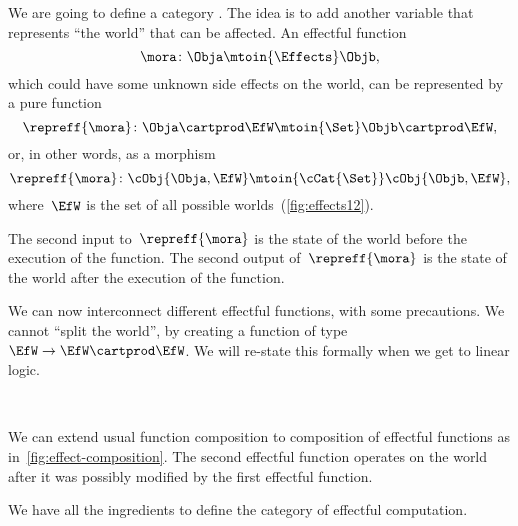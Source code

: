 We are going to define a category \Effects.
The idea is to add another variable that represents ``the world'' that can be affected.
An effectful function
%
\begin{equation}
    \mora\colon \Obja \mtoin{\Effects} \Objb,
\end{equation}
%
which could have some unknown side effects on the world, can be represented by a pure function
\begin{equation}
    \repreff{\mora}\colon  \Obja  \cartprod \EfW \mtoin{\Set}   \Objb \cartprod \EfW,
\end{equation}
or, in other words, as a morphism
\begin{equation}
    \repreff{\mora}\colon  \cObj{\Obja,\EfW} \mtoin{\cCat{\Set}}   \cObj{\Objb, \EfW},
\end{equation}
%
where~$\EfW$ is the set of all possible worlds~(\cref{fig:effects12}).

The second input to~$\repreff{\mora}$ is the state of the world before the execution of the function.
The second output of~$\repreff{\mora}$ is the state of the world after the execution of the function.

We can now interconnect different effectful functions, with some precautions.
We cannot ``split the world'', by creating a function of type~$\EfW \to  \EfW \cartprod \EfW$.
We will re-state this formally when we get to linear logic.

\begin{marginfigure}
    \centering
    \\
    \caption{}
    \label{fig:effect-composition}
\end{marginfigure}

We can extend usual function composition to composition of effectful functions as in~\cref{fig:effect-composition}.
The second effectful function operates on the world after it was possibly modified by the first effectful function.

We have all the ingredients to define the category \Effects of effectful computation.

